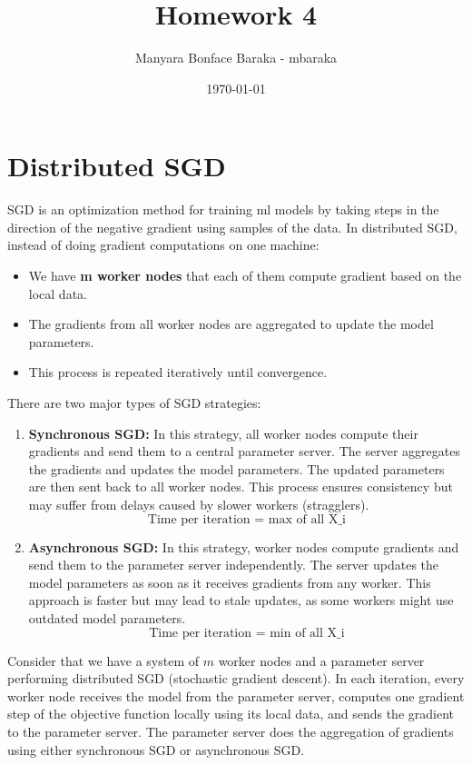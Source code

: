 \documentclass{article}
\begin{document}
\title{Homework 4}
\author{Manyara Bonface Baraka - mbaraka}
\date{\today}
\maketitle

\section{Distributed SGD}
SGD is an optimization method for training ml models by taking steps in the direction of the negative gradient using samples of the data. In distributed SGD, instead of doing
gradient computations on one machine:
\begin{itemize}
    \item We have \textbf{m worker nodes} that each of them compute gradient based on the local data.
    \item The gradients from all worker nodes are aggregated to update the model parameters.
    \item This process is repeated iteratively until convergence.
\end{itemize}
There are two major types of SGD strategies:
\begin{enumerate}
    \item \textbf{Synchronous SGD:} In this strategy, all worker nodes compute their gradients and send them to a central parameter server. The server aggregates the gradients and updates the model parameters. The updated parameters are then sent back to all worker nodes. This process ensures consistency but may suffer from delays caused by slower workers (stragglers).\\
    \[\text{Time per iteration = max of all X\_i}\]
    \item \textbf{Asynchronous SGD:} In this strategy, worker nodes compute gradients and send them to the parameter server independently. The server updates the model parameters as soon as it receives gradients from any worker. This approach is faster but may lead to stale updates, as some workers might use outdated model parameters.\\
    \[\text{Time per iteration = min of all X\_i}\]
\end{enumerate}


\clearpage
Consider that we have a system of $m$ worker nodes and a parameter server performing distributed SGD (stochastic gradient descent). In each iteration, every worker node receives the model from the parameter server, computes one gradient step of the objective function locally using its local data, and sends the gradient to the parameter server. The parameter server does the aggregation of gradients using either synchronous SGD or asynchronous SGD.
\end{document}
